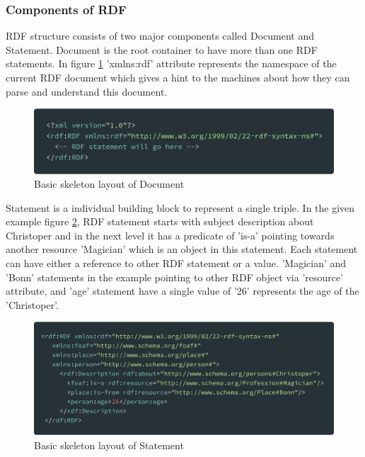 	\subsubsection{Components of RDF}
	
		RDF structure consists of two major components called Document and Statement. Document is the root container to have more than one RDF statements. In figure \ref{fig:rdf_document} 'xmlns:rdf' attribute represents the namespace of the current RDF document which gives a hint to the machines about how they can parse and understand this document.
		\begin{figure}[!htbp] 
			\begin{center}
				\includegraphics[scale=0.1]{./images/png/rdf/document}	
				\caption{Basic skeleton layout of Document}	
				\label{fig:rdf_document}	
			\end{center}
		\end{figure}
		
		Statement is a individual building block to represent a single triple. In the given example figure \ref{fig:rdf_statement}, RDF statement starts with subject description about Christoper and in the next level it has a predicate of 'is-a' pointing towards another resource 'Magician' which is an object in this statement. Each statement can have either a reference to other RDF statement or a value. 'Magician' and 'Bonn' statements in the example pointing to other RDF object via 'resource' attribute, and 'age' statement have a single value of '26' represents the age of the 'Christoper'.
		
		\begin{figure}[!htbp] 
			\begin{center}
				\includegraphics[scale=0.1]{./images/png/rdf/statement}	
				\caption{Basic skeleton layout of Statement}	
				\label{fig:rdf_statement}	
			\end{center}
		\end{figure}
	
